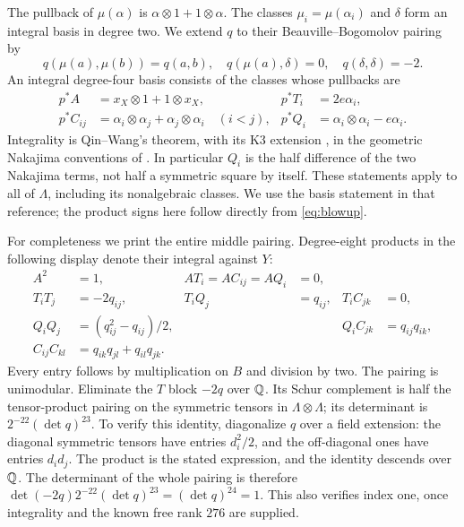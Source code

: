 The pullback of $\mu(\alpha)$ is $\alpha\otimes1+1\otimes\alpha$.
The classes $\mu_i=\mu(\alpha_i)$ and $\delta$ form an integral
basis in degree two. We extend $q$ to their Beauville--Bogomolov
pairing by
\begin{equation}\label{eq:BB}
 q(\mu(a),\mu(b))=q(a,b),\quad q(\mu(a),\delta)=0,\quad
 q(\delta,\delta)=-2.
\end{equation}
An integral degree-four basis consists of the classes whose
pullbacks are
\begin{equation}\label{eq:basis4}
 \begin{aligned}
 p^*A&=x_X\otimes1+1\otimes x_X,\qquad &p^*T_i&=2e\alpha_i,\\
 p^*C_{ij}&=\alpha_i\otimes\alpha_j+\alpha_j\otimes\alpha_i
       \quad(i<j),&p^*Q_i&=\alpha_i\otimes\alpha_i-e\alpha_i.
 \end{aligned}
\end{equation}
Integrality is Qin--Wang's theorem, with its K3 extension
\cite[Theorem~5.4 and Remark~5.6]{qw}, in the geometric
Nakajima conventions of \cite[Remark~5.7]{bns}. In particular
$Q_i$ is the half difference of the two Nakajima terms, not
half a symmetric square by itself. These statements apply to
all of $\Lambda$, including its nonalgebraic classes.
We use the basis statement in that reference; the product
signs here follow directly from \eqref{eq:blowup}.

For completeness we print the entire middle pairing. Degree-eight
products in the following display denote their integral against $Y$:
\begin{equation}\label{eq:gram}
 \begin{aligned}
 A^2&=1,& AT_i=AC_{ij}=AQ_i&=0,\\
 T_iT_j&=-2q_{ij},& T_iQ_j&=q_{ij},&T_iC_{jk}&=0,\\
 Q_iQ_j&=(q_{ij}^2-q_{ij})/2,&&&Q_iC_{jk}&=q_{ij}q_{ik},\\
 C_{ij}C_{kl}&=q_{ik}q_{jl}+q_{il}q_{jk}.
 \end{aligned}
\end{equation}
Every entry follows by multiplication on $B$ and division by two.
The pairing is unimodular. Eliminate the $T$ block $-2q$ over
$\mathbb Q$. Its Schur complement is half the tensor-product pairing
on the symmetric tensors in $\Lambda\otimes\Lambda$; its
determinant is $2^{-22}(\det q)^{23}$. To verify this identity,
diagonalize $q$ over a field extension: the diagonal symmetric
tensors have entries $d_i^2/2$, and the off-diagonal ones have
entries $d_i d_j$. The product is the stated expression, and
the identity descends over $\mathbb Q$. The determinant of the whole
pairing is therefore
$\det(-2q)2^{-22}(\det q)^{23}=(\det q)^{24}=1$.
This also verifies index one, once integrality and the known
free rank $276$ are supplied.

